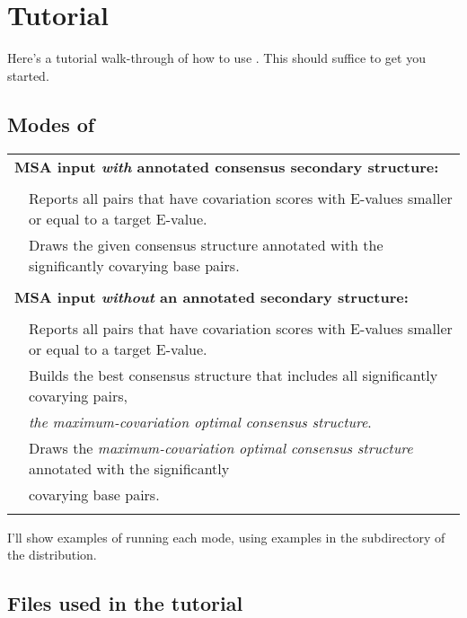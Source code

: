 
\section{Tutorial}
\label{section:tutorial}
\setcounter{footnote}{0}

Here's a tutorial walk-through of how to use \rscape. This should
suffice to get you started.

\subsection {Modes of \rscape}

\begin{tabular}{ll}
\multicolumn{2}{l}{\textbf{MSA input \textit{with} annotated consensus secondary structure:}} \\ 
 & \\ 
\textbf{}   & Reports all pairs that have covariation scores with E-values smaller or equal to a target E-value.\\
\textbf{}   & Draws the given consensus structure annotated with the significantly covarying base pairs.\\
 & \\ 
\multicolumn{2}{l}{\textbf{MSA input \textit{without} an annotated secondary structure:}}  \\
 & \\ 
\textbf{}   & Reports all pairs that have covariation scores with E-values smaller or equal to a target E-value.\\
\textbf{}   & Builds the best consensus structure that includes all significantly covarying pairs,\\
\textbf{}   & \hspace{5mm}\emph{the maximum-covariation optimal consensus structure}.\\
\textbf{}   & Draws the \emph{maximum-covariation optimal consensus structure} annotated with the significantly \\
\textbf{}   & \hspace{5mm}covarying base pairs.\\
 & \\ 
\end{tabular} 

I'll show examples of running each mode, using examples in the
 subdirectory of the distribution.


\subsection{Files used in the tutorial}

